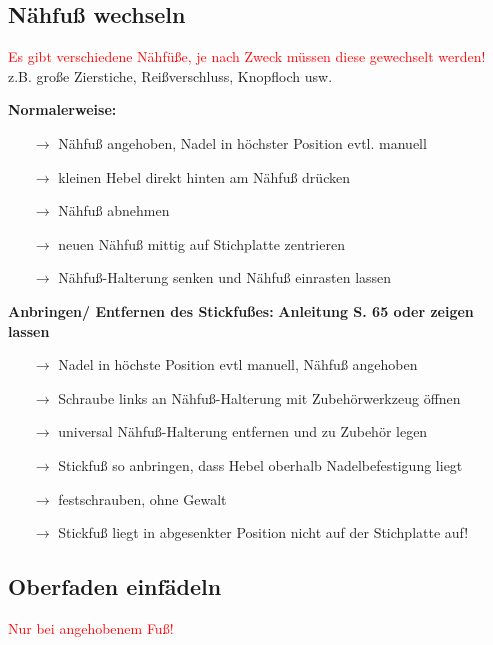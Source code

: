 \documentclass{\basedir/fablab-document}
\newcommand{\pfeil}{\ensuremath{\rightarrow}}
\begin{document}
\subsection{Nähfuß wechseln}
\textcolor{red}{Es gibt verschiedene Nähfüße, je nach Zweck müssen diese gewechselt werden! }
\newline z.B. große Zierstiche, Reißverschluss, Knopfloch usw. 

\vspace{2em}

\textbf{Normalerweise:}
\begin{itemize}
 \item[\pfeil] Nähfuß angehoben, Nadel in höchster Position evtl. manuell
 \item[\pfeil] kleinen Hebel direkt hinten am Nähfuß drücken
 \item[\pfeil] Nähfuß abnehmen
 \item[\pfeil] neuen Nähfuß mittig auf Stichplatte zentrieren 
 \item[\pfeil] Nähfuß-Halterung senken und Nähfuß einrasten lassen
\end{itemize}

\vspace{2em}

\textbf{Anbringen/ Entfernen des Stickfußes:}
\newline
\textbf{Anleitung S. 65 oder zeigen lassen}
\begin{itemize}
 \item[\pfeil] Nadel in höchste Position evtl manuell, Nähfuß angehoben
 \item[\pfeil] Schraube links an Nähfuß-Halterung mit Zubehörwerkzeug öffnen
 \item[\pfeil] universal Nähfuß-Halterung entfernen und zu Zubehör legen
 \item[\pfeil] Stickfuß so anbringen, dass Hebel oberhalb Nadelbefestigung liegt
 \item[\pfeil] festschrauben, ohne Gewalt
 \item[\pfeil] Stickfuß liegt in abgesenkter Position nicht auf der Stichplatte auf!
\end{itemize}

\subsection{Oberfaden einfädeln}

\textcolor{red}{Nur bei angehobenem Fuß!}

\vspace{1em}
\end{document}
